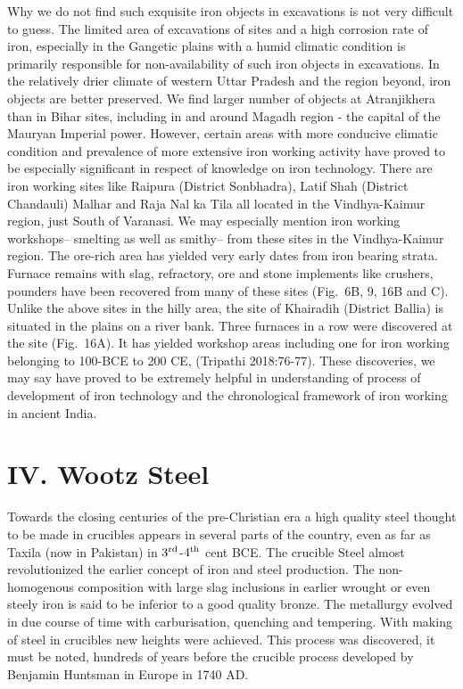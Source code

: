 Why we do not find such exquisite iron objects in excavations is not very difficult to guess. The limited area of excavations of sites and a high corrosion rate of iron, especially in the Gangetic plains with a humid climatic condition is primarily responsible for non-availability of such iron objects in excavations. In the relatively drier climate of western Uttar Pradesh and the region beyond, iron objects are better preserved. We find larger number of objects at Atranjikhera than in Bihar sites, including in and around Magadh region - the capital of the Mauryan Imperial power. However, certain areas with more conducive climatic condition and prevalence of more extensive iron working activity have proved to be especially significant in respect of knowledge on iron technology.  There are iron working sites like Raipura (District Sonbhadra), Latif Shah (District Chandauli) Malhar and Raja Nal ka Tila all located in the Vindhya-Kaimur region, just South of Varanasi. We may especially mention iron working workshops– smelting as well as smithy– from these sites in the Vindhya-Kaimur region. The ore-rich area has yielded very early dates from iron bearing strata. Furnace remains with slag, refractory, ore and stone implements like crushers, pounders have been recovered from many of these sites (Fig.~6B, 9, 16B and C). Unlike the above sites in the hilly area, the site of Khairadih (District Ballia) is situated in the plains on a river bank. Three furnaces in a row were discovered at the site (Fig.~16A). It has yielded workshop areas including one for iron working belonging to 100-BCE to 200 CE, (Tripathi 2018:76-77). These discoveries, we may say have proved to be extremely helpful in understanding of process of development of iron technology  and the chronological framework of iron working in ancient India.

\vspace{-.3cm}

\section*{IV. Wootz Steel}\label{section-4}

\vspace{-.2cm}

Towards the closing centuries of the pre-Christian era a high quality steel thought to be made in crucibles appears in several parts of the country, even as far as Taxila (now in Pakistan) in $3^{\rm rd}$-$4^{\rm th}$ cent BCE. The crucible Steel almost revolutionized the earlier concept of iron and steel production. The non-homogenous composition with large slag inclusions in earlier wrought or even steely iron is said to be inferior to a good quality bronze. The metallurgy evolved in due course of time with carburisation, quenching and tempering. With making of steel in crucibles new heights were achieved. This process was discovered, it must be noted, hundreds of years before the crucible process developed by Benjamin Huntsman in Europe in 1740 AD.

